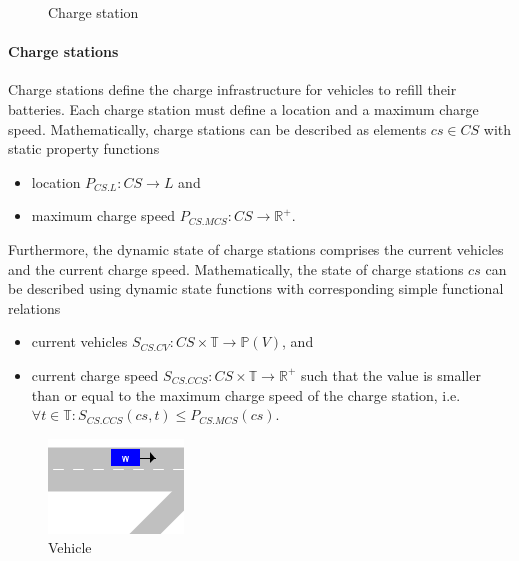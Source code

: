 \documentclass{IEEEtran}
\begin{document}
    \begin{figure}[htbp]
        \centering
        \caption{Charge station}
        \label{fig:charge-station}
    \end{figure}

    \paragraph{Charge stations}
    Charge stations define the charge infrastructure for vehicles to refill their batteries.
    Each charge station must define a location and a maximum charge speed.
    Mathematically, charge stations can be described as elements $cs \in CS$ with static property functions
    \begin{itemize}
        \item location $P_{CS.L}: CS \rightarrow L$ and
        \item maximum charge speed $P_{CS.MCS}: CS \rightarrow \mathbb{R}^+$.
    \end{itemize}
    Furthermore, the dynamic state of charge stations comprises the current vehicles and the current charge speed.
    Mathematically, the state of charge stations $cs$ can be described using dynamic state functions with corresponding simple functional relations
    \begin{itemize}
        \item current vehicles $S_{CS.CV}: CS \times \mathbb{T} \rightarrow \mathbb{P}(V)$, and
        \item current charge speed $S_{CS.CCS}: CS \times \mathbb{T} \rightarrow \mathbb{R}^+$ such that the value is smaller than or equal to the maximum charge speed of the charge station, i.e.\ $\forall t \in \mathbb{T}: S_{CS.CCS}(cs,t) \leq P_{CS.MCS}(cs)$.
    \end{itemize}

    \begin{figure}[htbp]
        \centering
        \includegraphics[scale=0.5]{../../concepts/vehicle.png}
        \caption{Vehicle}
        \label{fig:vehicle}
    \end{figure}
\end{document}
